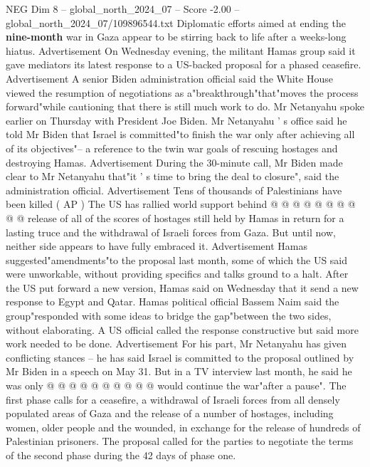 \begin{textsample}{NEG Dim 8 – global\_north\_2024\_07 – Score -2.00 – global\_north\_2024\_07/109896544.txt}  \label{ex:f8_neg_179}
Diplomatic efforts aimed at ending the \textbf{nine-month} war in Gaza appear to be stirring back to life after a weeks-long hiatus.
Advertisement On Wednesday evening, the militant Hamas group said it gave mediators its latest response to a US-backed proposal for a phased ceasefire.
Advertisement A senior Biden administration official said the White House viewed the resumption of negotiations as a"breakthrough"that"moves the process forward"while cautioning that there is still much work to do.
Mr Netanyahu spoke earlier on Thursday with President Joe Biden.
Mr Netanyahu ' s office said he told Mr Biden that Israel is committed"to finish the war only after achieving all of its objectives"-- a reference to the twin war goals of rescuing hostages and destroying Hamas.
Advertisement During the 30-minute call, Mr Biden made clear to Mr Netanyahu that"it ' s time to bring the deal to closure", said the administration official.
Advertisement Tens of thousands of Palestinians have been killed ( AP ) The US has rallied world support behind @ @ @ @ @ @ @ @ @ @ release of all of the scores of hostages still held by Hamas in return for a lasting truce and the withdrawal of Israeli forces from Gaza.
But until now, neither side appears to have fully embraced it.
Advertisement Hamas suggested"amendments"to the proposal last month, some of which the US said were unworkable, without providing specifics and talks ground to a halt.
After the US put forward a new version, Hamas said on Wednesday that it send a new response to Egypt and Qatar.
Hamas political official Bassem Naim said the group"responded with some ideas to bridge the gap"between the two sides, without elaborating.
A US official called the response constructive but said more work needed to be done.
Advertisement For his part, Mr Netanyahu has given conflicting stances -- he has said Israel is committed to the proposal outlined by Mr Biden in a speech on May 31.
But in a TV interview last month, he said he was only @ @ @ @ @ @ @ @ @ @ would continue the war"after a pause".
The first phase calls for a ceasefire, a withdrawal of Israeli forces from all densely populated areas of Gaza and the release of a number of hostages, including women, older people and the wounded, in exchange for the release of hundreds of Palestinian prisoners.
The proposal called for the parties to negotiate the terms of the second phase during the 42 days of phase one.

\end{textsample}
